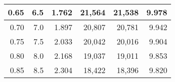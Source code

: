 \begin{longtable}{|r|r|r|r|r|r|}
			0.65                                                                                                   & 6.5                                                                                                   & 1.762                                                                                          & 21,564                                             & 21,538                                                    & 9.978                                             \\ \hline
			0.70                                                                                                   & 7.0                                                                                                   & 1.897                                                                                          & 20,807                                             & 20,781                                                    & 9.942                                             \\ \hline
			0.75                                                                                                   & 7.5                                                                                                   & 2.033                                                                                          & 20,042                                             & 20,016                                                    & 9.904                                             \\ \hline
			0.80                                                                                                   & 8.0                                                                                                   & 2.168                                                                                          & 19,037                                             & 19,011                                                    & 9.853                                             \\ \hline
			0.85                                                                                                   & 8.5                                                                                                   & 2.304                                                                                          & 18,422                                             & 18,396                                                    & 9.820                                             \\ \hline

\end{longtable}
